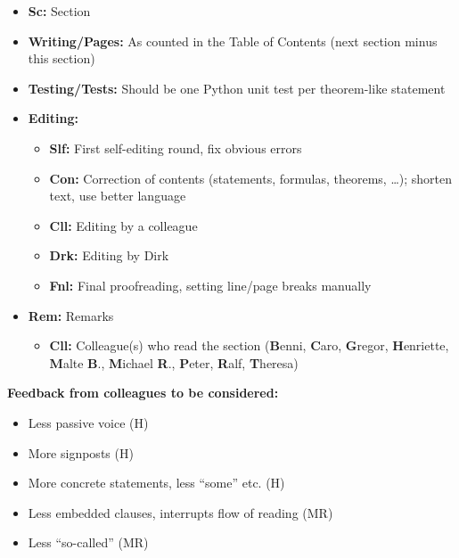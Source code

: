 \begin{itemize}
  \item
  \textbf{Sc:}
  Section
  
  \item
  \textbf{Writing/Pages:}
  As counted in the Table of Contents
  (next section minus this section)
  
  \item
  \textbf{Testing/Tests:}
  Should be one Python unit test per theorem-like statement
  
  \item
  \textbf{Editing:}
  \begin{itemize}
    \item
    \textbf{Slf:}
    First self-editing round, fix obvious errors
    
    \item
    \textbf{Con:}
    Correction of contents (statements, formulas, theorems, \dots);
    shorten text, use better language
    
    \item
    \textbf{Cll:}
    Editing by a colleague
    
    \item
    \textbf{Drk:}
    Editing by Dirk
    
    \item
    \textbf{Fnl:}
    Final proofreading, setting line/page breaks manually
  \end{itemize}
  
  \item
  \textbf{Rem:}
  Remarks
  \begin{itemize}
    \item
    \textbf{Cll:}
    Colleague(s) who read the section
    (\textbf{B}enni,
    \textbf{C}aro,
    \textbf{G}regor,
    \textbf{H}enriette,
    \textbf{M}alte \textbf{B}.,
    \textbf{M}ichael \textbf{R}.,
    \textbf{P}eter,
    \textbf{R}alf,
    \textbf{T}heresa)
  \end{itemize}
\end{itemize}

\noindent
\textbf{Feedback from colleagues to be considered:}

\begin{itemize}
  \item
  Less passive voice (H)
  
  \item
  More signposts (H)
  
  \item
  More concrete statements, less ``some'' etc. (H)
  
  \item
  Less embedded clauses, interrupts flow of reading (MR)
  
  \item
  Less ``so-called'' (MR)
\end{itemize}

\cleardoublepage
